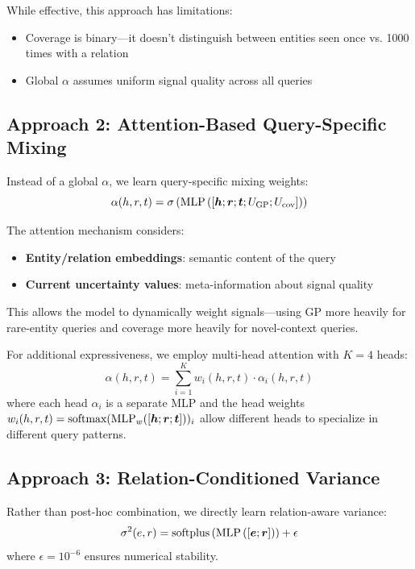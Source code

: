 While effective, this approach has limitations:
\begin{itemize}
    \item Coverage is binary---it doesn't distinguish between entities seen once vs. 1000 times with a relation
    \item Global $\alpha$ assumes uniform signal quality across all queries
\end{itemize}

\subsection{Approach 2: Attention-Based Query-Specific Mixing}

Instead of a global $\alpha$, we learn query-specific mixing weights:
\begin{equation}
    \alpha(h, r, t) = \sigma\left(\text{MLP}\left([\bm{h}; \bm{r}; \bm{t}; U_{\text{GP}}; U_{\text{cov}}]\right)\right)
\end{equation}

The attention mechanism considers:
\begin{itemize}
    \item \textbf{Entity/relation embeddings}: semantic content of the query
    \item \textbf{Current uncertainty values}: meta-information about signal quality
\end{itemize}

This allows the model to dynamically weight signals---using GP more heavily for rare-entity queries and coverage more heavily for novel-context queries.

For additional expressiveness, we employ multi-head attention with $K=4$ heads:
\begin{equation}
    \alpha(h,r,t) = \sum_{i=1}^K w_i(h,r,t) \cdot \alpha_i(h,r,t)
\end{equation}
where each head $\alpha_i$ is a separate MLP and the head weights $w_i(h,r,t) = \text{softmax}(\text{MLP}_w([\bm{h}; \bm{r}; \bm{t}]))_i$ allow different heads to specialize in different query patterns.

\subsection{Approach 3: Relation-Conditioned Variance}

Rather than post-hoc combination, we directly learn relation-aware variance:
\begin{equation}
    \sigma^2(e, r) = \text{softplus}\left(\text{MLP}\left([\bm{e}; \bm{r}]\right)\right) + \epsilon
\end{equation}
where $\epsilon = 10^{-6}$ ensures numerical stability.


